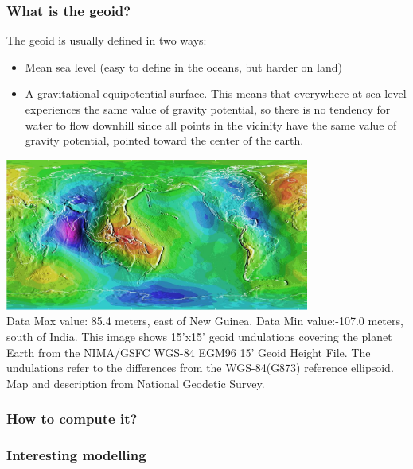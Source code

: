 
\subsubsection{What is the geoid?}



The geoid is usually defined in two ways:
\begin{itemize}
\item Mean sea level (easy to define in the oceans, but harder on land)
\item A gravitational equipotential surface. This means that everywhere at sea level experiences the same value of gravity potential, so there is no tendency for water to flow downhill since all points in the vicinity have the same value of gravity potential, pointed toward the center of the earth.
\end{itemize}

\begin{center}
\includegraphics[width=10cm]{images/geoid/ww15mgh}\\
{\captionfont Data Max value: 85.4 meters, east of New Guinea. Data Min value:-107.0 meters, south of India. 
This image shows 15'x15' geoid undulations covering the planet Earth from the NIMA/GSFC WGS-84 EGM96 15' Geoid Height File. The undulations refer to the differences from the WGS-84(G873) reference ellipsoid. Map and description from National Geodetic Survey.}
\end{center}


\subsubsection{How to compute it?}

\subsubsection{Interesting modelling}

